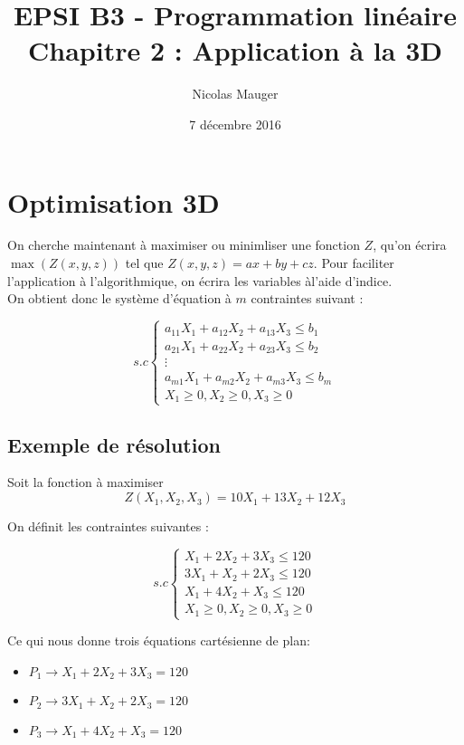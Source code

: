 



\title{EPSI B3 - Programmation linéaire\\Chapitre 2 : Application à la 3D}

\author{Nicolas Mauger}

\date{7 décembre 2016}

\maketitle

\section{Optimisation 3D}
On cherche maintenant à maximiser ou minimliser une fonction $Z$, qu'on écrira
$\max(Z(x,y,z))$ tel que $Z(x,y,z) = ax + by + cz$. Pour faciliter l'application
 à l'algorithmique, on écrira les variables àl'aide d'indice. \\

On obtient donc le système d'équation à $m$ contraintes suivant :

\begin{equation*}
  s.c
     \begin{cases}
        a_{11}X_{1} + a_{12}X_{2} + a_{13}X_{3} \leq b_{1} \\
        a_{21}X_{1} + a_{22}X_{2} + a_{23}X_{3} \leq b_{2} \\
        \vdots                           \\
        a_{m1}X_{1} + a_{m2}X_{2} + a_{m3}X_{3} \leq b_{m} \\
        X_{1} \geq 0, X_{2} \geq 0, X_{3} \geq 0
     \end{cases}
\end{equation*}

\subsection{Exemple de résolution}
Soit la fonction à maximiser
$$ Z(X_{1},X_{2},X_{3}) = 10X_{1} + 13X_{2} + 12X_{3} $$

On définit les contraintes suivantes :

\begin{equation*}
  s.c
     \begin{cases}
        X_{1} + 2X_{2} + 3X_{3} \leq 120 \\
        3X_{1} + X_{2} + 2X_{3} \leq 120 \\
        X_{1} + 4X_{2} + X_{3} \leq 120 \\
        X_{1} \geq 0, X_{2} \geq 0, X_{3} \geq 0
     \end{cases}
\end{equation*}

Ce qui nous donne trois équations cartésienne de plan:
\begin{itemize}
  \item $P_{1} \rightarrow X_{1} + 2X_{2} + 3X_{3} = 120 $
  \item $P_{2} \rightarrow 3X_{1} + X_{2} + 2X_{3} = 120 $
  \item $P_{3} \rightarrow X_{1} + 4X_{2} + X_{3} = 120 $
\end{itemize}



